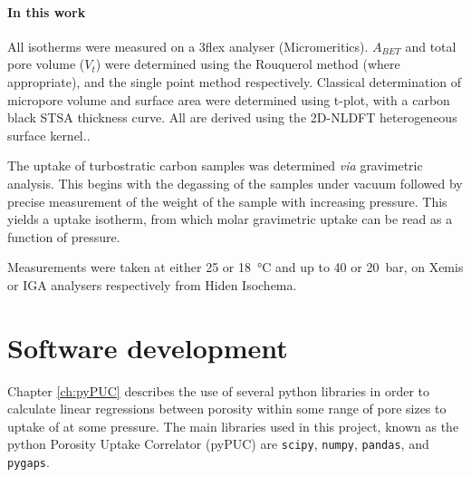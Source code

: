 \begin{comment}
	\begin{enumerate}[label=(\arabic*)]
		\item The intercept of the original \acrshort{bet} transform must be positive, as a negative intercept would yield a negative value for $c$.
		\item The range selected must correspond to a region of the Rouquerol transform where $Q \left(1 - \frac{P}{P_0} \right)$ constantly increases with $\frac{P}{P_0}$.
		\item $Q_m$ as determined from (1) and (2) can be found in the region of the isotherm selected.\citep{Rouquerol2007Is} 
	\end{enumerate}

\end{comment}

\paragraph{In this work} All isotherms were measured on a 3flex analyser (Micromeritics). $A_{BET}$ and total pore volume ($V_t$) were determined using the Rouquerol method (where appropriate), and the single point method respectively. Classical determination of \gls{micropore} volume and surface area were determined using t-plot, with a carbon black STSA thickness curve. All  are derived using the 2D-NLDFT heterogeneous surface kernel.\citep{Jagiello20132D}.

The  uptake of \gls{turbostratic carbon} samples was determined \textit{via} gravimetric analysis. This begins with the degassing of the samples under vacuum followed by precise measurement of the weight of the sample with increasing  pressure. This yields a  uptake isotherm, from which molar gravimetric uptake can be read as a function of pressure.

Measurements were taken at either \num{25} or \qty{18}{\degreeCelsius} and up to \num{40} or \qty{20}{\bar}, on Xemis or IGA analysers respectively from Hiden Isochema. 

\section{Software development}
Chapter \ref{ch:pyPUC} describes the use of several python libraries in order to calculate linear regressions between porosity within some range of pore sizes to uptake of  at some pressure. The main libraries used in this project, known as the python Porosity Uptake Correlator (pyPUC) are \verb|scipy|,\citep{SciPy2020} \verb|numpy|,\citep{numpy2022} \verb|pandas|,\citep{pandas2010} and \verb|pygaps|.\citep{Iacomi2019pyGAPS}

